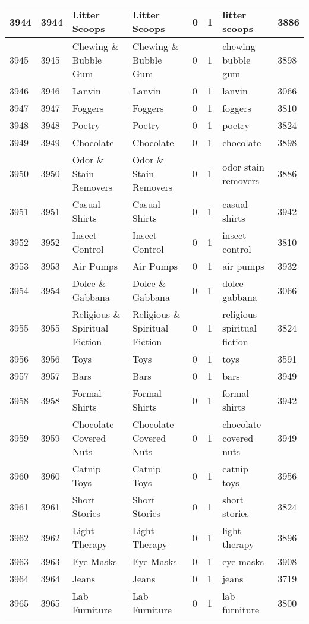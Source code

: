 \begin{longtable}{|l|l|l|l|l|l|l|l|}
3944 & 3944 & Litter Scoops & Litter Scoops & 0 & 1 & litter scoops & 3886 \\ \hline 
3945 & 3945 & Chewing \& Bubble Gum & Chewing \& Bubble Gum & 0 & 1 & chewing bubble gum & 3898 \\ \hline 
3946 & 3946 & Lanvin & Lanvin & 0 & 1 & lanvin & 3066 \\ \hline 
3947 & 3947 & Foggers & Foggers & 0 & 1 & foggers & 3810 \\ \hline 
3948 & 3948 & Poetry & Poetry & 0 & 1 & poetry & 3824 \\ \hline 
3949 & 3949 & Chocolate & Chocolate & 0 & 1 & chocolate & 3898 \\ \hline 
3950 & 3950 & Odor \& Stain Removers & Odor \& Stain Removers & 0 & 1 & odor stain removers & 3886 \\ \hline 
3951 & 3951 & Casual Shirts & Casual Shirts & 0 & 1 & casual shirts & 3942 \\ \hline 
3952 & 3952 & Insect Control & Insect Control & 0 & 1 & insect control & 3810 \\ \hline 
3953 & 3953 & Air Pumps & Air Pumps & 0 & 1 & air pumps & 3932 \\ \hline 
3954 & 3954 & Dolce \& Gabbana & Dolce \& Gabbana & 0 & 1 & dolce gabbana & 3066 \\ \hline 
3955 & 3955 & Religious \& Spiritual Fiction & Religious \& Spiritual Fiction & 0 & 1 & religious spiritual fiction & 3824 \\ \hline 
3956 & 3956 & Toys & Toys & 0 & 1 & toys & 3591 \\ \hline 
3957 & 3957 & Bars & Bars & 0 & 1 & bars & 3949 \\ \hline 
3958 & 3958 & Formal Shirts & Formal Shirts & 0 & 1 & formal shirts & 3942 \\ \hline 
3959 & 3959 & Chocolate Covered Nuts & Chocolate Covered Nuts & 0 & 1 & chocolate covered nuts & 3949 \\ \hline 
3960 & 3960 & Catnip Toys & Catnip Toys & 0 & 1 & catnip toys & 3956 \\ \hline 
3961 & 3961 & Short Stories & Short Stories & 0 & 1 & short stories & 3824 \\ \hline 
3962 & 3962 & Light Therapy & Light Therapy & 0 & 1 & light therapy & 3896 \\ \hline 
3963 & 3963 & Eye Masks & Eye Masks & 0 & 1 & eye masks & 3908 \\ \hline 
3964 & 3964 & Jeans & Jeans & 0 & 1 & jeans & 3719 \\ \hline 
3965 & 3965 & Lab Furniture & Lab Furniture & 0 & 1 & lab furniture & 3800 \\ \hline 

\end{longtable}
